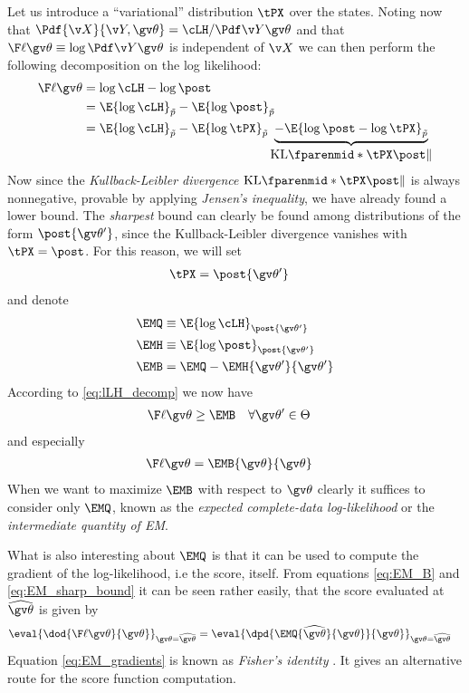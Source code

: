 Let us introduce a ``variational'' 
distribution $\tPX$ over the states.
Noting now that $\Pdf{\X}{\Y,\Th}=\cLH/\LH$ and that $\lLH\equiv\log\LH$ is independent of $\X$ we can then perform the
following decomposition on the log likelihood:
\begin{align}
	\lLH &= \log\cLH - \log\post \nonumber\\
	&= \E{\log\cLH}_{\tP} - \E{\log\post}_{\tP} \nonumber\\ 
	&= \E{\log\cLH}_{\tP}-\E{\log\tPX}_{\tP}
	\underbrace{-\E{\log\post-\log\tPX}_{\tP}}_{{\displaystyle \KL{\tPX}{\post}}}
	\label{eq:lLH_decomp}
\end{align}
Now since the \emph{Kullback-Leibler divergence} $\KL{\tPX}{\post}$ is always nonnegative, 
provable by applying \emph{Jensen's inequality},
we have already found a lower bound. The \emph{sharpest} bound can clearly be found among
distributions of the form $\post{\Th'}$, since the Kullback-Leibler divergence vanishes with $\tPX=\post$.
For this reason, we will set
\begin{align}
	\tPX &= \post{\Th'}
\end{align} 
and denote
\begin{align}
	\EMQ &\equiv \E{\log\cLH}_{\post{\Th'}} \label{eq:EM_Q}\\
	\EMH &\equiv \E{\log\post}_{\post{\Th'}} \label{eq:EM_H}\\
	\EMB &= \EMQ - \EMH{\Th'}{\Th'} \label{eq:EM_B}
\end{align}
According to \eqref{eq:lLH_decomp} we now have
\begin{align}
	\lLH & \geq \EMB \quad \forall \Th' \in \Theta
	\label{eq:EM_LB}
\end{align}
and especially
\begin{align}
	\lLH & = \EMB{\Th}{\Th}
	\label{eq:EM_sharp_bound}
\end{align}
When we want to maximize $\EMB$ with respect to $\Th$
clearly it suffices to consider
only $\EMQ$, known as the \emph{expected complete-data log-likelihood}
or the \emph{intermediate quantity of EM}.

What is also interesting about $\EMQ$ is that it can be used to compute the gradient of the log-likelihood, i.e
the score, itself. From equations \eqref{eq:EM_B}
and \eqref{eq:EM_sharp_bound} it can be seen rather easily, that  
the score evaluated at $\widehat{\Th}$ is given by
\begin{align}
		\eval{\dod{\lLH}{\Th}}_{\Th=\widehat\Th}&=
		\eval{\dpd{ \EMQ{\widehat\Th}{\Th}}{\Th}}_{\Th=\widehat\Th} \label{eq:EM_gradients}
\end{align} 
Equation \eqref{eq:EM_gradients} is known as \emph{Fisher's identity} \parencite{Cappe2005}. It gives
an alternative route for the score function computation.
 

